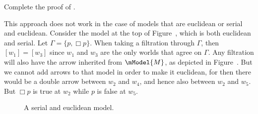 \documentclass[../../../include/open-logic-section]{subfiles}
\begin{document}
\begin{prob}
  Complete the proof of .
\end{prob}

This approach does not work in the case of models that are euclidean
or serial and euclidean. Consider the model at the top of
Figure~, which is both euclidean and serial. Let
$\Gamma = \{p, \Box p \}$. When taking a filtration through $\Gamma$,
then $[w_1] = [w_3]$ since $w_1$ and $w_3$ are the only worlds that
agree on $\Gamma$. Any filtration will also have the arrow inherited
from $\mModel{M}$, as depicted in Figure~. But we
cannot add arrows to that model in order to make it euclidean, for
then there would be a double arrow between $w_2$ and $w_4$, and hence
also between $w_2$ and $w_5$. But $\Box p$ is true at $w_2$ while $p$
is false at $w_5$.

\begin{figure}[htpb]
  \centering
  \caption{A serial and euclidean model.}
\end{figure}
\end{document}
